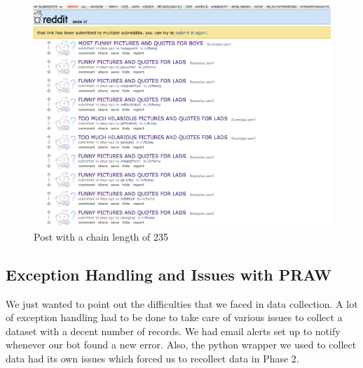 \documentclass{article} %
\begin{document}
\begin{figure}[h]
\begin{center}
\includegraphics[width=4.5in]{funny.png}
\caption{Post with a chain length of 235}
\end{center}
\end{figure}

\newpage

\subsection{Exception Handling and Issues with PRAW}

We just wanted to point out the difficulties that we faced in data collection. A lot of exception handling had to be done to take care of various issues to collect a dataset with a decent number of records. We had email alerts set up to notify whenever our bot found a new error. Also, the python wrapper we used to collect data had its own issues which forced us to recollect data in Phase 2.
\end{document}
